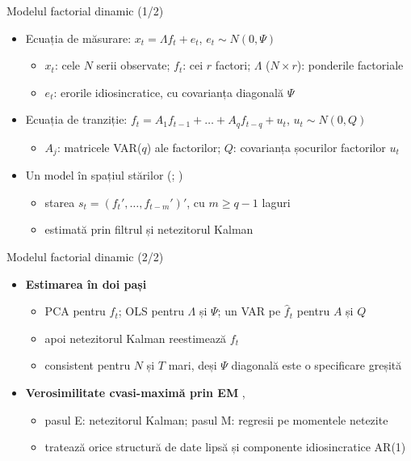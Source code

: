 \begin{frame}{Modelul factorial dinamic (1/2)}
\itemsize{\small}
\begin{itemize}
    \item Ecuația de măsurare: $x_t = \Lambda f_t + e_t$, $e_t \sim N(0, \Psi)$
    \begin{itemize}
        \item $x_t$: cele $N$ serii observate; $f_t$: cei $r$ factori; $\Lambda$ ($N\times r$): ponderile factoriale
        \item $e_t$: erorile idiosincratice, cu covarianța diagonală $\Psi$
    \end{itemize}
    \item Ecuația de tranziție: $f_t = A_1f_{t-1} + \dots + A_qf_{t-q} + u_t$, $u_t \sim N(0, Q)$
    \begin{itemize}
        \item $A_j$: matricele VAR($q$) ale factorilor; $Q$: covarianța șocurilor factorilor $u_t$
    \end{itemize}
    \item Un model în spațiul stărilor (; )
    \begin{itemize}
        \item starea $s_t = (f_t', \dots, f_{t-m}')'$, cu $m \ge q - 1$ laguri
        \item estimată prin filtrul și netezitorul Kalman
    \end{itemize}
\end{itemize}
\end{frame}

\begin{frame}{Modelul factorial dinamic (2/2)}
\itemsize{\small}
\begin{itemize}
    \item \textbf{Estimarea în doi pași} 
    \begin{itemize}
        \item PCA pentru $\hat f_t$; OLS pentru $\Lambda$ și $\Psi$; un VAR pe $\hat f_t$ pentru $A$ și $Q$
        \item apoi netezitorul Kalman reestimează $f_t$
        \item consistent pentru $N$ și $T$ mari, deși $\Psi$ diagonală este o specificare greșită
    \end{itemize}
    \item \textbf{Verosimilitate cvasi-maximă prin EM} , 
    \begin{itemize}
        \item pasul E: netezitorul Kalman; pasul M: regresii pe momentele netezite
        \item tratează orice structură de date lipsă și componente idiosincratice AR(1)
    \end{itemize}
\end{itemize}
\end{frame}

